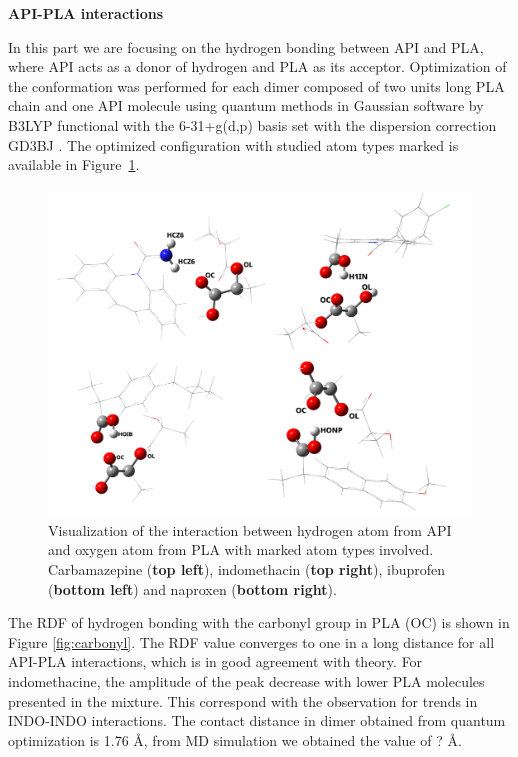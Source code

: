 \newpage
\textbf{API-PLA interactions}

In this part we are focusing on the hydrogen bonding between API and PLA, where API acts as a donor of hydrogen and PLA as its acceptor. Optimization of the conformation was performed for each dimer composed of two units long PLA chain and one API molecule using quantum methods in Gaussian\cite{frisch_gaussian16_2016} software by B3LYP functional with the 6-31+g(d,p) basis set with the dispersion correction GD3BJ \cite{smith_revised_2016}. The optimized configuration with studied atom types marked is available in Figure~\ref{fig:contact}.
\vspace{-0.3cm}
\begin{figure}[htb!]
	\includegraphics[width=\linewidth]{img/all_pla_api_bp.png} 
	\vspace{-1cm}
	\caption{Visualization of the interaction between hydrogen atom from API and oxygen atom from PLA with marked atom types involved. Carbamazepine (\textbf{top left}), indomethacin (\textbf{top right}), ibuprofen (\textbf{bottom left}) and naproxen (\textbf{bottom right}).}
	\vspace{-0.3cm}
	\label{fig:contact}    
\end{figure}


The RDF of hydrogen bonding with the carbonyl group in PLA (OC) is shown in Figure \ref{fig:carbonyl}. The RDF value converges to one in a long distance for all API-PLA interactions, which is in good agreement with theory. For indomethacine, the amplitude of the peak decrease with lower PLA molecules presented in the mixture. This correspond with the observation for trends in INDO-INDO interactions. The contact distance in dimer obtained from quantum optimization is 1.76 \AA, from MD simulation we obtained the value of ? \AA.

